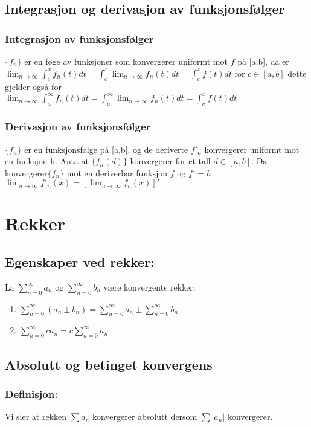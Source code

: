 \documentclass[8pt,a4paper,twocolumn,twoside]{article}
\def\abs#1{\lvert #1 \rvert}
\begin{document}
        \subsection*{Integrasjon og derivasjon av funksjonsfølger}
            \subsubsection*{Integrasjon av funksjonsfølger}
            $\{f_n\}$ er en føge av funksjoner som konvergerer uniformt mot $f$ på [a,b], da er $\lim_{n\to\infty}\int_c^x f_n(t)dt = \int_c^x\lim_{n\to\infty}f_n(t)dt=\int_c^xf(t)dt$
            for $c \in [a,b]$ dette gjelder også for\\ $\lim_{n\to\infty}\int_a^\infty f_n(t)dt = \int_a^\infty\lim_{n\to\infty}f_n(t)dt=\int_c^xf(t)dt$
            \subsubsection*{Derivasjon av funksjonsfølger}
            $\{f_n\}$ er en funksjonsfølge på [a,b], og de deriverte $f'_n$ konvergerer uniformt mot en funksjon h. Anta 
            at $\{f_n(d)\}$ konvergerer for et tall $d\in [a,b]$. Da konvergerer$\{f_n\}$ mot en deriverbar funksjon $f$ og $f'=h$\\
            $\lim_{n\to\infty}f'_n(x)=[\lim_{n\to\infty}f_n(x)]'$
            
    \section*{Rekker}
        \subsection*{Egenskaper ved rekker:}
        La $\sum_{n=0}^\infty a_n$ og $\sum_{n=0}^\infty b_n$ være konvergente rekker:
        \begin{enumerate}[topsep = 0pt,partopsep = 0pt, itemsep = 0cm]
            \item $\sum_{n=0}^\infty (a_n \pm b_n) = \sum_{n=0}^\infty a_n \pm \sum_{n=0}^\infty b_n$
            \item $\sum_{n=0}^\infty ca_n=c\sum_{n=0}^\infty a_n$
        \end{enumerate}
        \subsection*{Absolutt og betinget konvergens}
        \subsubsection*{Definisjon:} 
        Vi sier at rekken $\sum a_n$ konvergerer absolutt dersom $\sum\abs{a_n}$ konvergerer.
\end{document}

